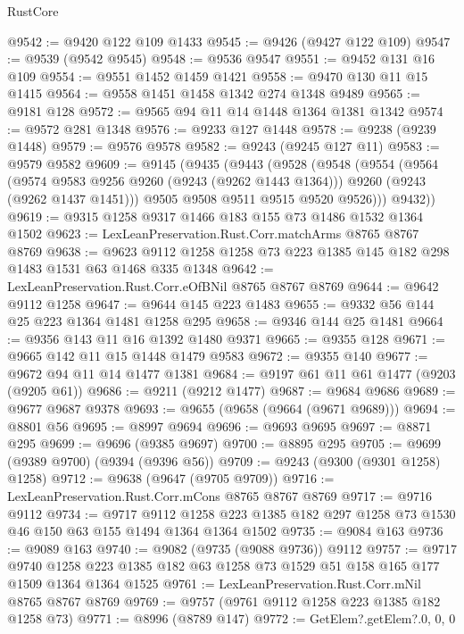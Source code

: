 \begin{lexlean}{RustCore}
\begin{coremodule}
@9542 := @9420 @122 @109 @1433
@9545 := @9426 (@9427 @122 @109)
@9547 := @9539 (@9542 @9545)
@9548 := @9536 @9547
@9551 := @9452 @131 @16 @109
@9554 := @9551 @1452 @1459 @1421
@9558 := @9470 @130 @11 @15 @1415
@9564 := @9558 @1451 @1458 @1342 @274 @1348 @9489
@9565 := @9181 @128
@9572 := @9565 @94 @11 @14 @1448 @1364 @1381 @1342
@9574 := @9572 @281 @1348
@9576 := @9233 @127 @1448
@9578 := @9238 (@9239 @1448)
@9579 := @9576 @9578
@9582 := @9243 (@9245 @127 @11)
@9583 := @9579 @9582
@9609 := @9145
    (@9435
      (@9443
        (@9528
          (@9548
            (@9554
              (@9564
                (@9574 @9583 @9256 @9260 (@9243 (@9262 @1443 @1364)))
                @9260
                (@9243 (@9262 @1437 @1451)))
              @9505
              @9508
              @9511
              @9515
              @9520
              @9526)))
        @9432))
@9619 := @9315 @1258 @9317 @1466 @183 @155 @73 @1486 @1532 @1364 @1502
@9623 := LexLeanPreservation.Rust.Corr.matchArms @8765 @8767 @8769
@9638 := @9623 @9112 @1258 @1258 @73 @223 @1385 @145 @182 @298 @1483 @1531 @63 @1468 @335 @1348
@9642 := LexLeanPreservation.Rust.Corr.eOfBNil @8765 @8767 @8769
@9644 := @9642 @9112 @1258
@9647 := @9644 @145 @223 @1483
@9655 := @9332 @56 @144 @25 @223 @1364 @1481 @1258 @295
@9658 := @9346 @144 @25 @1481
@9664 := @9356 @143 @11 @16 @1392 @1480 @9371
@9665 := @9355 @128
@9671 := @9665 @142 @11 @15 @1448 @1479 @9583
@9672 := @9355 @140
@9677 := @9672 @94 @11 @14 @1477 @1381
@9684 := @9197 @61 @11 @61 @1477 (@9203 (@9205 @61))
@9686 := @9211 (@9212 @1477)
@9687 := @9684 @9686
@9689 := @9677 @9687 @9378
@9693 := @9655 (@9658 (@9664 (@9671 @9689)))
@9694 := @8801 @56
@9695 := @8997 @9694
@9696 := @9693 @9695
@9697 := @8871 @295
@9699 := @9696 (@9385 @9697)
@9700 := @8895 @295
@9705 := @9699 (@9389 @9700) (@9394 (@9396 @56))
@9709 := @9243 (@9300 (@9301 @1258) @1258)
@9712 := @9638 (@9647 (@9705 @9709))
@9716 := LexLeanPreservation.Rust.Corr.mCons @8765 @8767 @8769
@9717 := @9716 @9112
@9734 := @9717
    @9112
    @1258
    @223
    @1385
    @182
    @297
    @1258
    @73
    @1530
    @46
    @150
    @63
    @155
    @1494
    @1364
    @1364
    @1502
@9735 := @9084 @163
@9736 := @9089 @163
@9740 := @9082 (@9735 (@9088 @9736)) @9112
@9757 := @9717
    @9740
    @1258
    @223
    @1385
    @182
    @63
    @1258
    @73
    @1529
    @51
    @158
    @165
    @177
    @1509
    @1364
    @1364
    @1525
@9761 := LexLeanPreservation.Rust.Corr.mNil @8765 @8767 @8769
@9769 := @9757 (@9761 @9112 @1258 @223 @1385 @182 @1258 @73)
@9771 := @8996 (@8789 @147)
@9772 := GetElem?.getElem?.{0, 0, 0}

\end{coremodule}
\end{lexlean}
